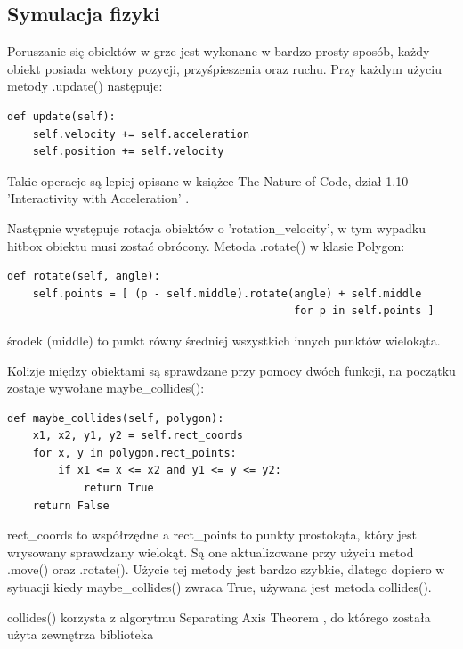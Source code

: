 \documentclass[12pt,a4paper]{article}
\begin{document}
\subsection{Symulacja fizyki}
Poruszanie się obiektów w grze jest wykonane w bardzo prosty sposób, każdy obiekt posiada wektory pozycji, przyśpieszenia oraz
ruchu. Przy każdym użyciu metody .update() następuje:
\begin{verbatim}
def update(self):
    self.velocity += self.acceleration
    self.position += self.velocity
\end{verbatim}
Takie operacje są lepiej opisane w książce The Nature of Code, dział 1.10 'Interactivity with Acceleration' \cite{noc}.

\vspace{\baselineskip}
\noindent Następnie występuje rotacja obiektów o 'rotation\_velocity', w tym wypadku hitbox obiektu musi zostać obrócony.
Metoda .rotate() w klasie Polygon:
\begin{verbatim}
def rotate(self, angle):
    self.points = [ (p - self.middle).rotate(angle) + self.middle 
                                             for p in self.points ]
\end{verbatim}
środek (middle) to punkt równy średniej wszystkich innych punktów wielokąta.

\vspace{\baselineskip}
\noindent Kolizje między obiektami są sprawdzane przy pomocy dwóch funkcji, na początku zostaje wywołane maybe\_collides():
\begin{verbatim}
def maybe_collides(self, polygon):
    x1, x2, y1, y2 = self.rect_coords
    for x, y in polygon.rect_points:
        if x1 <= x <= x2 and y1 <= y <= y2:
            return True
    return False
\end{verbatim}

\noindent rect\_coords to współrzędne a rect\_points to punkty prostokąta, który jest wrysowany sprawdzany wielokąt.
Są one aktualizowane przy użyciu metod .move() oraz .rotate().
Użycie tej metody jest bardzo szybkie, dlatego dopiero w sytuacji kiedy maybe\_collides() zwraca True, używana jest metoda collides().

\vspace{\baselineskip}
\noindent collides() korzysta z algorytmu Separating Axis Theorem \cite{collisions} \cite{SAT}, do którego została użyta zewnętrza biblioteka \cite{SATlib} %
\end{document}
